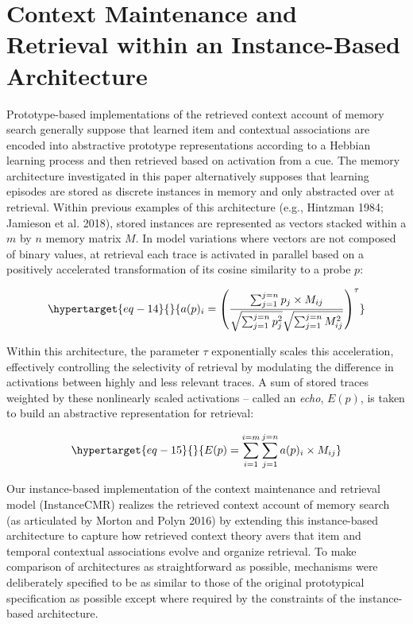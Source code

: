 \documentclass[
  letterpaper,
  DIV=11]{article}
\begin{document}
\hypertarget{context-maintenance-and-retrieval-within-an-instance-based-architecture}{%
\section{Context Maintenance and Retrieval within an Instance-Based
Architecture}\label{context-maintenance-and-retrieval-within-an-instance-based-architecture}}

Prototype-based implementations of the retrieved context account of
memory search generally suppose that learned item and contextual
associations are encoded into abstractive prototype representations
according to a Hebbian learning process and then retrieved based on
activation from a cue. The memory architecture investigated in this
paper alternatively supposes that learning episodes are stored as
discrete instances in memory and only abstracted over at retrieval.
Within previous examples of this architecture (e.g., Hintzman 1984;
Jamieson et al. 2018), stored instances are represented as vectors
stacked within a \(m\) by \(n\) memory matrix \(M\). In model variations
where vectors are not composed of binary values, at retrieval each trace
is activated in parallel based on a positively accelerated
transformation of its cosine similarity to a probe \(p\):

\begin{equation}\protect\hypertarget{eq-14}{}{
a(p)_i = \left({\frac {\sum^{j=n}_{j=1}{p_j \times M_{ij}}} {\sqrt{\sum^{j=n}_{j=1}{p^2_j}}
        \sqrt{\sum^{j=n}_{j=1}{M^2_{ij}}}}}\right)^{\tau}
}\label{eq-14}\end{equation}

Within this architecture, the parameter \(\tau\) exponentially scales
this acceleration, effectively controlling the selectivity of retrieval
by modulating the difference in activations between highly and less
relevant traces. A sum of stored traces weighted by these nonlinearly
scaled activations -- called an \emph{echo}, \(E(p)\), is taken to build
an abstractive representation for retrieval:

\begin{equation}\protect\hypertarget{eq-15}{}{
E(p) = \sum^{i=m}_{i=1}\sum^{j=n}_{j=1}a(p)_i \times M_{ij}
}\label{eq-15}\end{equation}

Our instance-based implementation of the context maintenance and
retrieval model (InstanceCMR) realizes the retrieved context account of
memory search (as articulated by Morton and Polyn 2016) by extending
this instance-based architecture to capture how retrieved context theory
avers that item and temporal contextual associations evolve and organize
retrieval. To make comparison of architectures as straightforward as
possible, mechanisms were deliberately specified to be as similar to
those of the original prototypical specification as possible except
where required by the constraints of the instance-based architecture.
\end{document}
